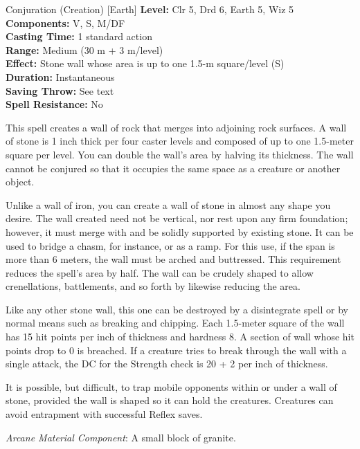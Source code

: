 {Conjuration (Creation) [Earth]}
{
	\textbf{Level:}
	Clr 5, Drd 6, Earth 5, Wiz 5\\
	\textbf{Components:}
	V, S, M/DF\\
	\textbf{Casting Time:}
	1 standard action\\
	\textbf{Range:}
	Medium (30 m + 3 m/level)\\
	\textbf{Effect:}
	Stone wall whose area is up to one 1.5-m square/level (S)\\
	\textbf{Duration:}
	Instantaneous\\
	\textbf{Saving Throw:}
	See text\\
	\textbf{Spell Resistance:}
	No\\
}
{
	This spell creates a wall of rock that merges into adjoining rock surfaces. A wall of stone is 1 inch thick per four caster levels and composed of up to one 1.5-meter square per level. You can double the wall's area by halving its thickness. The wall cannot be conjured so that it occupies the same space as a creature or another object.

	Unlike a wall of iron, you can create a wall of stone in almost any shape you desire. The wall created need not be vertical, nor rest upon any firm foundation; however, it must merge with and be solidly supported by existing stone. It can be used to bridge a chasm, for instance, or as a ramp. For this use, if the span is more than 6 meters, the wall must be arched and buttressed. This requirement reduces the spell's area by half. The wall can be crudely shaped to allow crenellations, battlements, and so forth by likewise reducing the area.

	Like any other stone wall, this one can be destroyed by a disintegrate spell or by normal means such as breaking and chipping. Each 1.5-meter square of the wall has 15 hit points per inch of thickness and hardness 8. A section of wall whose hit points drop to 0 is breached. If a creature tries to break through the wall with a single attack, the DC for the Strength check is 20 + 2 per inch of thickness.

	It is possible, but difficult, to trap mobile opponents within or under a wall of stone, provided the wall is shaped so it can hold the creatures. Creatures can avoid entrapment with successful Reflex saves.

	\textit{Arcane Material Component}:
	A small block of granite.

}
